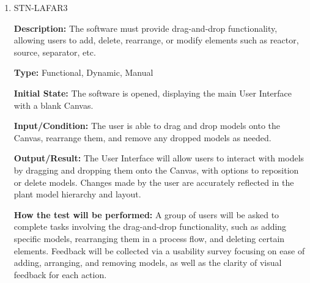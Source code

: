 \documentclass[12pt, titlepage]{article}
\begin{document}
\begin{enumerate}
\textbf{Output/Result:} The User Interface will reflect the selected theme (light or dark) across all elements. Specific color coding will apply to the models: input ports will be green, output ports will be red, and info ports will be blue.

\textbf{How the test will be performed:} Testers will evaluate the color scheme on multiple screens, ensuring adherence to the specified color guidelines and documenting any inconsistencies.

\item{STN-LAFAR3\\}

\textbf{Description:} The software must provide drag-and-drop functionality, allowing users to add, delete, rearrange, or modify elements such as reactor, source, separator, etc.

\textbf{Type:} Functional, Dynamic, Manual

\textbf{Initial State:} The software is opened, displaying the main User Interface with a blank Canvas.

\textbf{Input/Condition:} The user is able to drag and drop models onto the Canvas, rearrange them, and remove any dropped models as needed.

\textbf{Output/Result:} The User Interface will allow users to interact with models by dragging and dropping them onto the Canvas, with options to reposition or delete models. Changes made by the user are accurately reflected in the plant model hierarchy and layout.

\textbf{How the test will be performed:} A group of users will be asked to complete tasks involving the drag-and-drop functionality, such as adding specific models, rearranging them in a process flow, and deleting certain elements. Feedback will be collected via a usability survey focusing on ease of adding, arranging, and removing models, as well as the clarity of visual feedback for each action.


\end{enumerate}
\end{document}
